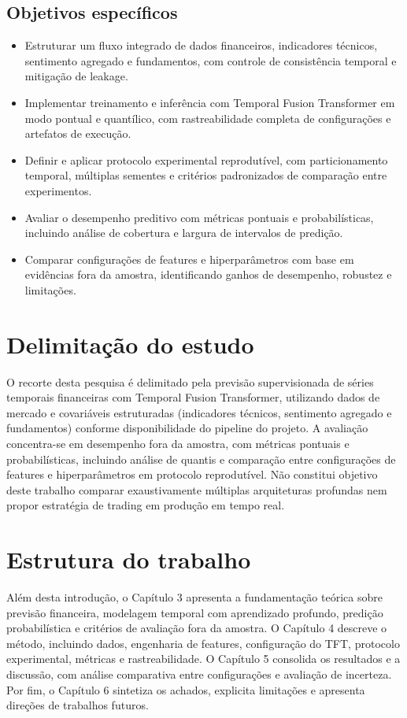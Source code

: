 \subsection{Objetivos específicos}
\begin{itemize}
    \item Estruturar um fluxo integrado de dados financeiros, indicadores técnicos, sentimento agregado e fundamentos, com controle de consistência temporal e mitigação de leakage.
    \item Implementar treinamento e inferência com Temporal Fusion Transformer em modo pontual e quantílico, com rastreabilidade completa de configurações e artefatos de execução.
    \item Definir e aplicar protocolo experimental reprodutível, com particionamento temporal, múltiplas sementes e critérios padronizados de comparação entre experimentos.
    \item Avaliar o desempenho preditivo com métricas pontuais e probabilísticas, incluindo análise de cobertura e largura de intervalos de predição.
    \item Comparar configurações de features e hiperparâmetros com base em evidências fora da amostra, identificando ganhos de desempenho, robustez e limitações.
\end{itemize}

\section{Delimitação do estudo}
O recorte desta pesquisa é delimitado pela previsão supervisionada de séries temporais financeiras com Temporal Fusion Transformer, utilizando dados de mercado e covariáveis estruturadas (indicadores técnicos, sentimento agregado e fundamentos) conforme disponibilidade do pipeline do projeto. A avaliação concentra-se em desempenho fora da amostra, com métricas pontuais e probabilísticas, incluindo análise de quantis e comparação entre configurações de features e hiperparâmetros em protocolo reprodutível. Não constitui objetivo deste trabalho comparar exaustivamente múltiplas arquiteturas profundas nem propor estratégia de trading em produção em tempo real.

\section{Estrutura do trabalho}
Além desta introdução, o Capítulo 3 apresenta a fundamentação teórica sobre previsão financeira, modelagem temporal com aprendizado profundo, predição probabilística e critérios de avaliação fora da amostra. O Capítulo 4 descreve o método, incluindo dados, engenharia de features, configuração do TFT, protocolo experimental, métricas e rastreabilidade. O Capítulo 5 consolida os resultados e a discussão, com análise comparativa entre configurações e avaliação de incerteza. Por fim, o Capítulo 6 sintetiza os achados, explicita limitações e apresenta direções de trabalhos futuros.
